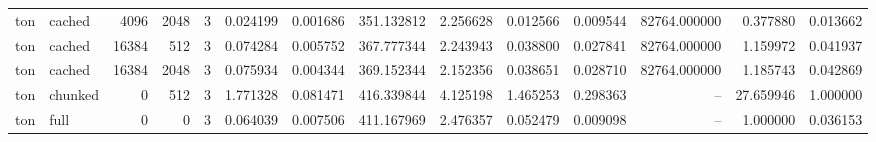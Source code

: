 \begin{tabular}{llrrrrrrrrrrrr}
ton & cached & 4096 & 2048 & 3 & 0.024199 & 0.001686 & 351.132812 & 2.256628 & 0.012566 & 0.009544 & 82764.000000 & 0.377880 & 0.013662 \\
ton & cached & 16384 & 512 & 3 & 0.074284 & 0.005752 & 367.777344 & 2.243943 & 0.038800 & 0.027841 & 82764.000000 & 1.159972 & 0.041937 \\
ton & cached & 16384 & 2048 & 3 & 0.075934 & 0.004344 & 369.152344 & 2.152356 & 0.038651 & 0.028710 & 82764.000000 & 1.185743 & 0.042869 \\
ton & chunked & 0 & 512 & 3 & 1.771328 & 0.081471 & 416.339844 & 4.125198 & 1.465253 & 0.298363 & -- & 27.659946 & 1.000000 \\
ton & full & 0 & 0 & 3 & 0.064039 & 0.007506 & 411.167969 & 2.476357 & 0.052479 & 0.009098 & -- & 1.000000 & 0.036153 \\
\bottomrule
\end{tabular}
